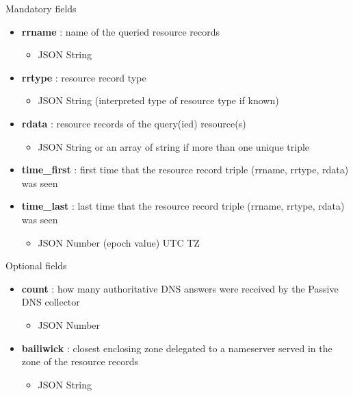 \begin{frame}[t]{Mandatory fields}
\begin{itemize}
\item \textbf{rrname} : name of the queried resource records
\begin{itemize}
\item JSON String
\end{itemize}
\item \textbf{rrtype} : resource record type
\begin{itemize}
\item JSON String (interpreted type of resource type if known)
\end{itemize}
\item \textbf{rdata} : resource records of the query(ied) resource(s)
\begin{itemize}
\item JSON String or an array of string if more than one unique triple
\end{itemize}
\item \textbf{time\_first} : first time that the resource record triple (rrname, rrtype, rdata) was seen
\item \textbf{time\_last} : last time that the resource record triple (rrname, rrtype, rdata) was seen
\begin{itemize}
\item JSON Number (epoch value) UTC TZ
\end{itemize}
\end{itemize}
\end{frame}

\begin{frame}[t]{Optional fields}
\begin{itemize}
\item \textbf{count} : how many authoritative DNS answers were received by the Passive DNS collector
\begin{itemize}
\item JSON Number
\end{itemize}
\item \textbf{bailiwick} : closest enclosing zone delegated to a nameserver served in the zone of the resource records
\begin{itemize}
\item JSON String
\end{itemize}

\end{itemize}
\end{frame}

